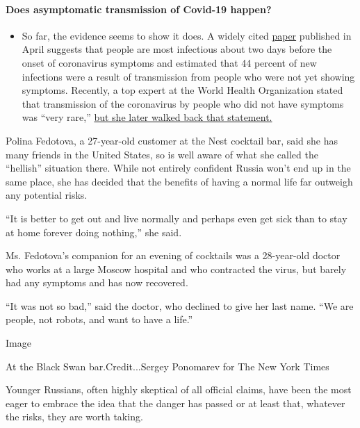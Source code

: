 \begin{itemize}
{  \paragraph{Does asymptomatic transmission of Covid-19
  happen?}\label{does-asymptomatic-transmission-of-covid-19-happen}}

  \begin{itemize}
  \tightlist
  \item
    So far, the evidence seems to show it does. A widely cited
    \href{https://www.nature.com/articles/s41591-020-0869-5}{paper}
    published in April suggests that people are most infectious about
    two days before the onset of coronavirus symptoms and estimated that
    44 percent of new infections were a result of transmission from
    people who were not yet showing symptoms. Recently, a top expert at
    the World Health Organization stated that transmission of the
    coronavirus by people who did not have symptoms was ``very rare,''
    \href{https://www.nytimes3xbfgragh.onion/2020/06/09/world/coronavirus-updates.html?action=click\&pgtype=Article\&state=default\&region=MAIN_CONTENT_3\&context=storylines_faq\#link-1f302e21}{but
    she later walked back that statement.}
  \end{itemize}
\end{itemize}

Polina Fedotova, a 27-year-old customer at the Nest cocktail bar, said
she has many friends in the United States, so is well aware of what she
called the ``hellish'' situation there. While not entirely confident
Russia won't end up in the same place, she has decided that the benefits
of having a normal life far outweigh any potential risks.

``It is better to get out and live normally and perhaps even get sick
than to stay at home forever doing nothing,'' she said.

Ms. Fedotova's companion for an evening of cocktails was a 28-year-old
doctor who works at a large Moscow hospital and who contracted the
virus, but barely had any symptoms and has now recovered.

``It was not so bad,'' said the doctor, who declined to give her last
name. ``We are people, not robots, and want to have a life.''

Image

At the Black Swan bar.Credit...Sergey Ponomarev for The New York Times

Younger Russians, often highly skeptical of all official claims, have
been the most eager to embrace the idea that the danger has passed or at
least that, whatever the risks, they are worth taking.

